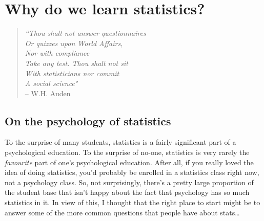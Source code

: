 


\chapter{Why do we learn statistics?~\label{ch:whystats}}


\begin{verse}{\it
``Thou shalt not answer questionnaires \\
Or quizzes upon World Affairs, \\
\hspace*{.5cm}    Nor with compliance \\
Take any test. Thou shalt not sit  \\
With statisticians nor commit \\
\hspace*{.5cm}    A social science" }\vspace*{6pt} \\ 
\hspace*{2cm} -- W.H. Auden
\end{verse}
\vspace*{12pt}


\section{On the psychology of statistics~\label{sec:whywhywhy}}

To the surprise of many students, statistics is a fairly significant part of a psychological education. To the surprise of no-one, statistics is very rarely the {\it favourite} part of one's psychological education. After all, if you really loved the idea of doing statistics, you'd probably be enrolled in a statistics class right now, not a psychology class. So, not surprisingly, there's a pretty large proportion of the student base that isn't happy about the fact that psychology has so much statistics in it. In view of this, I thought that the right place to start might be to answer some of the more common questions that people have about stats\ldots 

